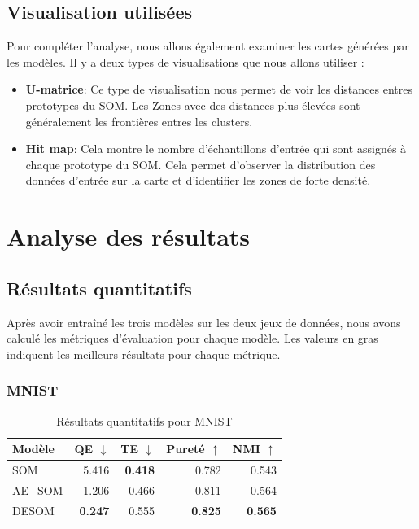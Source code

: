 \documentclass[12pt,a4paper]{report}
\begin{document}
\subsection{Visualisation utilisées}
Pour compléter l'analyse, nous allons également examiner les cartes générées par les modèles.
Il y a deux types de visualisations que nous allons utiliser :
\begin{itemize}
    \item \textbf{U-matrice}: Ce type de visualisation nous permet de voir les distances entres prototypes du SOM. 
    Les Zones avec des distances plus élevées sont généralement les frontières entres les clusters.
    \item \textbf{Hit map}: Cela montre le nombre d'échantillons d'entrée qui sont assignés à chaque prototype du SOM.
    Cela permet d'observer la distribution des données d'entrée sur la carte et d'identifier les zones de forte densité.
\end{itemize}

\section{Analyse des résultats}

\subsection{Résultats quantitatifs}
Après avoir entraîné les trois modèles sur les deux jeux de données, nous avons calculé les métriques d'évaluation pour chaque modèle.
Les valeurs en gras indiquent les meilleurs résultats pour chaque métrique.

\subsubsection{MNIST}
\begin{table}[H]
\centering
\caption{Résultats quantitatifs pour MNIST}
\label{tab:results_mnist}
\begin{tabular}{lrrrr}
\toprule
Modèle & QE $\downarrow$ & TE $\downarrow$ & Pureté $\uparrow$ & NMI $\uparrow$ \\
\midrule
SOM & 5.416 & \textbf{0.418} & 0.782 & 0.543  \\
AE+SOM & 1.206 & 0.466 & 0.811 & 0.564  \\
DESOM & \textbf{0.247} & 0.555 & \textbf{0.825} & \textbf{0.565} \\
\bottomrule
\end{tabular}
\end{table}
\end{document}
